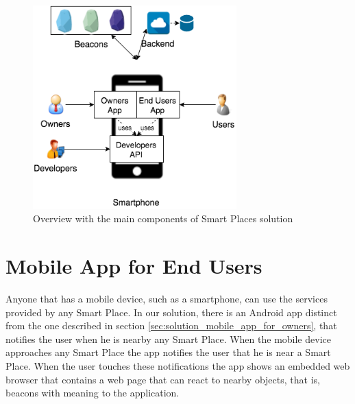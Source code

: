 \begin{figure}[!ht]
  \centering
    \includegraphics[width=0.7\textwidth, keepaspectratio]{images/smart_places_solution_overview}
    \caption[Solution Overview]{Overview with the main components of Smart Places solution}
    \label{fig:solution_overview}
\end{figure}

\section{Mobile App for End Users}
\label{sec:solution_mobile_app_for_end_users}
Anyone that has a mobile device, such as a smartphone, can use the services provided by any Smart Place.
In our solution, there is an Android app distinct from the one described in section \ref{sec:solution_mobile_app_for_owners}, that notifies the user when he is nearby any Smart Place.
When the mobile device approaches any Smart Place the app notifies the user that he is near a Smart Place.
When the user touches these notifications the app shows an embedded web browser that contains a web page that can react to nearby objects, that is, beacons with meaning to the application.


